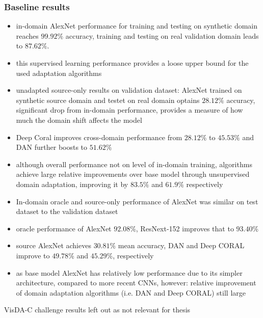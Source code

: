 \subsubsection{Baseline results}
\begin{itemize}
	\item in-domain AlexNet performance for training and testing on synthetic domain reaches $99.92\%$ accuracy, training and testing on real validation domain leads to $87.62\%$.
	\item this supervised learning performance provides a loose upper bound for the used adaptation algorithms
	\item unadapted source-only results on validation dataset: AlexNet trained on synthetic source domain and testet on real domain optains $28.12\%$ accuracy, significant drop from in-domain performance, provides a measure of how much the domain shift affects the model
	\item Deep Coral improves cross-domain performance from $28.12\%$ to $45.53\%$ and DAN further boosts to $51.62\%$
	\item although overall performance not on level of in-domain training, algorithms achieve large relative improvements over base model through unsupervised domain adaptation, improving it by $83.5\%$ and $61.9\%$ respectively
	\item In-domain oracle and source-only performance of AlexNet was similar on test dataset to the validation dataset
	\item oracle performance of AlexNet $92.08\%$, ResNext-152 improves that to $93.40\%$
	\item source AlexNet achieves $30.81\%$ mean accuracy, DAN and Deep CORAL improve to $49.78\%$ and $45.29\%$, respectively
	\item as base model AlexNet has relatively low performance due to its simpler architecture, compared to more recent CNNs, however: relative improvement of domain adaptation algorithms (i.e. DAN and Deep CORAL) still large
\end{itemize}

VisDA-C challenge results left out as not relevant for thesis

